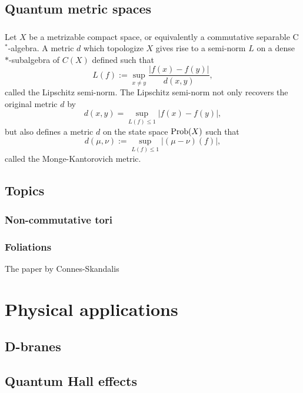 \documentclass{../../large}
\begin{document}
\chapter{Quantum metric spaces}


\section{}
Let $X$ be a metrizable compact space, or equivalently a commutative separable C$^*$-algebra.
A metric $d$ which topologize $X$ gives rise to a semi-norm $L$ on a dense $*$-subalgebra of $C(X)$ defined such that
\[L(f):=\sup_{x\ne y}\frac{|f(x)-f(y)|}{d(x,y)},\]
called the Lipschitz semi-norm.
The Lipschitz semi-norm not only recovers the original metric $d$ by
\[d(x,y)=\sup_{L(f)\le1}|f(x)-f(y)|,\]
but also defines a metric $d$ on the state space $\operatorname{Prob}(X)$ such that
\[d(\mu,\nu):=\sup_{L(f)\le1}|(\mu-\nu)(f)|,\]
called the Monge-Kantorovich metric.





\chapter{Topics}



\section{Non-commutative tori}



\section{Foliations}
The paper by Connes-Skandalis








\part{Physical applications}

\chapter{D-branes}

\chapter{Quantum Hall effects}
\end{document}
